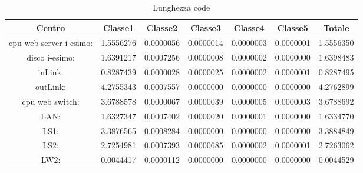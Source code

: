 \begin{table}[H]
\begin{center}\begin{scriptsize}
\begin{tabular}{||c|c|c|c|c|c|c||}
\hline
Centro &Classe1 &Classe2 &Classe3 &Classe4 &Classe5 &Totale\\
\hline
\hline
 cpu web server i-esimo: 	&1.5556276	&0.0000056	&0.0000014	&0.0000003	&0.0000001	&1.5556350\\
\hline
 disco i-esimo: 	&1.6391217	&0.0007256	&0.0000008	&0.0000002	&0.0000000	&1.6398483\\
\hline
 inLink: 	&0.8287439	&0.0000028	&0.0000025	&0.0000002	&0.0000001	&0.8287495\\
\hline
 outLink: 	&4.2755343	&0.0007557	&0.0000000	&0.0000000	&0.0000000	&4.2762899\\
\hline
 cpu web switch: 	&3.6788578	&0.0000067	&0.0000039	&0.0000005	&0.0000003	&3.6788692\\
\hline
 LAN: 	&1.6327347	&0.0007402	&0.0000020	&0.0000001	&0.0000000	&1.6334770\\
\hline
 LS1: 	&3.3876565	&0.0008284	&0.0000000	&0.0000000	&0.0000000	&3.3884849\\
\hline
 LS2: 	&2.7254981	&0.0007393	&0.0000685	&0.0000002	&0.0000001	&2.7263062\\
\hline
 LW2: 	&0.0044417	&0.0000112	&0.0000000	&0.0000000	&0.0000000	&0.0044529\\
\hline
\end{tabular}
\end{scriptsize}\end{center}
\caption{Lunghezza code}
\label{ris}
\end{table}

